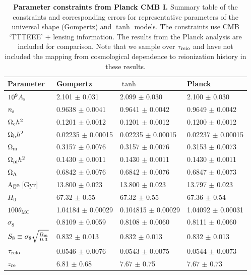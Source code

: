 \begin{table}
\centering
\small
\begin{tabular}{llll}
\toprule
Parameter & Gompertz & $\tanh$ & Planck \\
\midrule
$10^{9} A_\mathrm{s}$ & 2.101 $\pm$ 0.031 & 2.099 $\pm$ 0.030 & 2.100 $\pm$ 0.030 \\
$n_\mathrm{s}$ & 0.9638 $\pm$ 0.0041 & 0.9641 $\pm$ 0.0042 & 0.9649 $\pm$ 0.0042 \\
$\Omega_\mathrm{c} h^2$ & 0.1201 $\pm$ 0.0012 & 0.1201 $\pm$ 0.0012 & 0.1200 $\pm$ 0.0012 \\
$\Omega_\mathrm{b} h^2 $ & 0.02235 $\pm$ 0.00015 & 0.02235 $\pm$ 0.00015 & 0.02237 $\pm$ 0.00015 \\
$\Omega_\mathrm{m}$ & 0.3157 $\pm$ 0.0076 & 0.3157 $\pm$ 0.0076 & 0.3153 $\pm$ 0.0073 \\
$\Omega_\mathrm{m} h^2$ & 0.1430 $\pm$ 0.0011 & 0.1430 $\pm$ 0.0011 & 0.1430 $\pm$ 0.0011 \\
$\Omega_\Lambda$ & 0.6842 $\pm$ 0.0076 & 0.6842 $\pm$ 0.0076 & 0.6847 $\pm$ 0.0073 \\
Age [Gyr] & 13.800 $\pm$ 0.023 & 13.800 $\pm$ 0.023 & 13.797 $\pm$ 0.023 \\
$H_0$ & 67.32 $\pm$ 0.55 & 67.32 $\pm$ 0.55 & 67.36 $\pm$ 0.54 \\
$100 \theta_\mathrm{MC}$ & 1.04184 $\pm$ 0.00029 & 0.104815 $\pm$ 0.00029 & 1.04092 $\pm$ 0.00031 \\
$\sigma_8$ & 0.8109 $\pm$ 0.0059 & 0.8108 $\pm$ 0.0060 & 0.8111 $\pm$ 0.0060 \\
$S_8 \equiv \sigma_8 \sqrt{\frac{\Omega_\mathrm{m}}{0.3}}$ & 0.832 $\pm$ 0.013 & 0.832 $\pm$ 0.013 & 0.832 $\pm$ 0.013\\
$\tau_{\mathrm{reio}}$ & 0.0546 $\pm$ 0.0076 & 0.0543 $\pm$ 0.0075 & 0.0544 $\pm$ 0.0073 \\
$z_{\mathrm{re}}$ & 6.81 $\pm$ 0.68 & 7.67 $\pm$ 0.75 & 7.67 $\pm$ 0.73 \\
\bottomrule
\end{tabular}
\caption{\textbf{Parameter constraints from Planck CMB I.}
Summary table of the constraints and corresponding errors for
representative parameters of the universal shape (Gompertz) and $\tanh$
models.
The constraints use CMB `TTTEEE' + lensing information.
The results from the Planck analysis \cite{Planck2020a} are included for
comparison.
Note that we sample over $\tau_{\mathrm{reio}}$ and have not included the mapping
from cosmological dependence to reionization history in these results.}
\label{tab:tau_comp}
\end{table}


